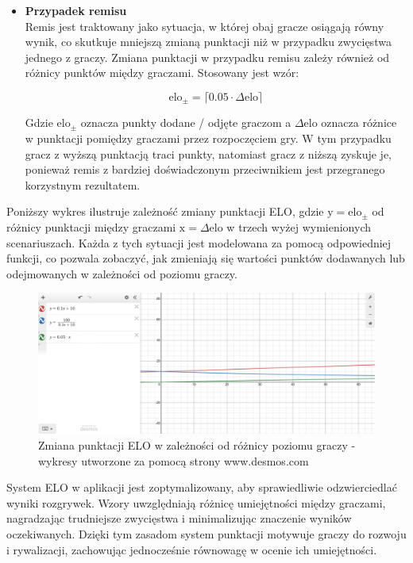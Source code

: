 \documentclass[12pt,a4paper]{article}
\begin{document}
\begin{itemize}
    \item \textbf{Przypadek remisu}\\
    Remis jest traktowany jako sytuacja, w której obaj gracze osiągają równy wynik, co skutkuje mniejszą zmianą punktacji niż w przypadku zwycięstwa jednego z graczy. Zmiana punktacji w przypadku remisu zależy również od różnicy punktów między graczami. Stosowany jest wzór:

    \[ \text{elo}_{\pm} = \lceil 0.05 \cdot \Delta \text{elo} \rceil \]

    Gdzie $ \text{elo}_{\pm} $ oznacza punkty dodane / odjęte graczom a $ \Delta \text{elo} $ oznacza różnice w punktacji pomiędzy graczami przez rozpoczęciem gry.     W tym przypadku gracz z wyższą punktacją traci punkty, natomiast gracz z niższą zyskuje je, ponieważ remis z bardziej doświadczonym przeciwnikiem jest przegranego korzystnym rezultatem.
\end{itemize}

\newpage


\noindent
Poniższy wykres ilustruje zależność zmiany punktacji ELO, gdzie $ \text{y} = \text{elo}_{\pm} $ od różnicy punktacji między graczami $ \text{x} = \Delta \text{elo} $  w trzech wyżej wymienionych scenariuszach. Każda z tych sytuacji jest modelowana za pomocą odpowiedniej funkcji, co pozwala zobaczyć, jak zmieniają się wartości punktów dodawanych lub odejmowanych w zależności od poziomu graczy.

\vspace{1cm}
\begin{figure}[h!]
    \centering
    \includegraphics[width=1\textwidth]{images/graf_elo_calc.png}
    \caption{Zmiana punktacji ELO w zależności od różnicy poziomu graczy - wykresy utworzone za pomocą strony www.desmos.com}
\end{figure}
\vspace{1cm}

\noindent
System ELO w aplikacji jest zoptymalizowany, aby sprawiedliwie odzwierciedlać wyniki rozgrywek. Wzory uwzględniają różnicę umiejętności między graczami, nagradzając trudniejsze zwycięstwa i minimalizując znaczenie wyników oczekiwanych. Dzięki tym zasadom system punktacji motywuje graczy do rozwoju i rywalizacji, zachowując jednocześnie równowagę w ocenie ich umiejętności.
\\\\
\end{document}
